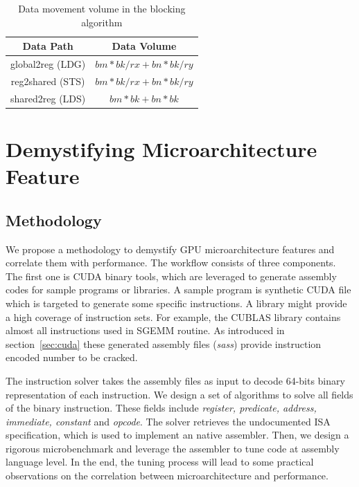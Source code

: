 \documentclass{sig-alternate-05-2015}
\begin{document}
\begin{table}[!t]
\caption{Data movement volume in the blocking algorithm}
\centering
\scalebox{1.0} {
\begin{tabular}{|c||c|}
\hline
Data Path& Data Volume\\
\hline
global2reg (LDG)& $bm*bk/rx + bn*bk/ry$\\
\hline
reg2shared (STS)& $bm*bk/rx + bn*bk/ry$\\
\hline
shared2reg (LDS)& $bm*bk + bn*bk$\\
\hline
\end{tabular}
}
\label{tab:reg}
\end{table}

\section{Demystifying Microarchitecture Feature}
\label{sec:assembler}

\subsection{Methodology}
We propose a methodology to demystify GPU microarchitecture features and correlate them with performance. The workflow consists of three components.  The first one is CUDA binary tools, which are leveraged to generate assembly codes for sample programs or libraries. A sample program is synthetic CUDA file which is targeted to generate some specific instructions. A library might provide a high coverage of instruction sets. For example, the CUBLAS library contains almost all instructions used in SGEMM routine. As introduced in section~\ref{sec:cuda} these generated assembly files ({\em sass}) provide instruction encoded number to be cracked.

The instruction solver takes the assembly files as input to decode 64-bits binary representation of each instruction. We design a set of algorithms to solve all fields of the binary instruction. These fields include {\em register, predicate, address, immediate, constant} and {\em opcode}. The solver retrieves the undocumented ISA specification, which is used to implement an native assembler. Then, we design a rigorous microbenchmark and leverage the assembler to tune code at assembly language level. In the end, the tuning process will lead to some practical observations on the correlation between microarchitecture and performance.
\end{document}
